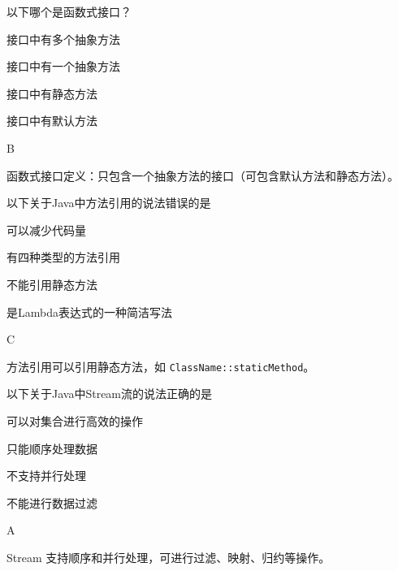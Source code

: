 \begin{question}
	以下哪个是函数式接口？
	\begin{options}
		\item 接口中有多个抽象方法
		\item 接口中有一个抽象方法
		\item 接口中有静态方法
		\item 接口中有默认方法
	\end{options}
	\begin{answer}
		B
	\end{answer}
	\begin{explanation}
		函数式接口定义：只包含一个抽象方法的接口（可包含默认方法和静态方法）。
	\end{explanation}
\end{question}

\begin{question}
	以下关于Java中方法引用的说法错误的是
	\begin{options}
		\item 可以减少代码量
		\item 有四种类型的方法引用
		\item 不能引用静态方法
		\item 是Lambda表达式的一种简洁写法
	\end{options}
	\begin{answer}
		C
	\end{answer}
	\begin{explanation}
		方法引用可以引用静态方法，如 \texttt{ClassName::staticMethod}。
	\end{explanation}
\end{question}

\begin{question}
	以下关于Java中Stream流的说法正确的是
	\begin{options}
		\item 可以对集合进行高效的操作
		\item 只能顺序处理数据
		\item 不支持并行处理
		\item 不能进行数据过滤
	\end{options}
	\begin{answer}
		A
	\end{answer}
	\begin{explanation}
		Stream 支持顺序和并行处理，可进行过滤、映射、归约等操作。
	\end{explanation}
\end{question}

